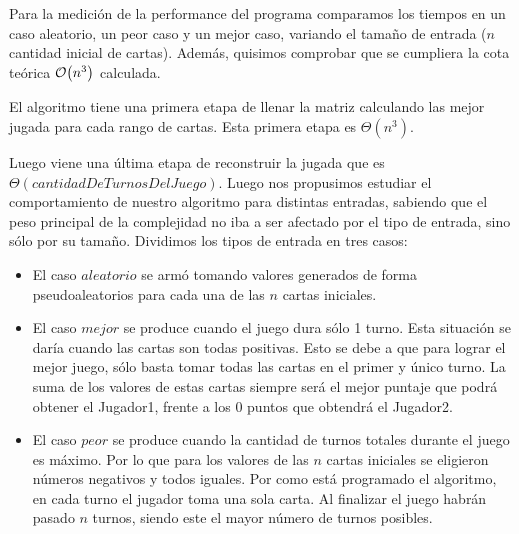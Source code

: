 \documentclass[11pt, a4paper, twoside]{article}
\begin{document}
{}

Para la medición de la performance del programa comparamos los tiempos en un caso aleatorio, un peor caso y 
un mejor caso, variando el tamaño de entrada ($n$ cantidad inicial de cartas). Además, quisimos comprobar que se 
cumpliera la cota teórica $\mathop{}\mathopen{}\mathcal{O}\mathopen{}\left(n^3\right)$ calculada. 

El algoritmo tiene una primera etapa de llenar la matriz calculando las mejor jugada para cada rango de cartas. Esta primera etapa es $\Theta(n^3)$.

Luego viene una última etapa de reconstruir la jugada que es $\Theta(cantidadDeTurnosDelJuego)$. Luego nos propusimos estudiar el comportamiento de nuestro algoritmo para distintas entradas, sabiendo que el peso principal de la complejidad no iba a ser afectado por el tipo de entrada, sino sólo por su tamaño. Dividimos los tipos de entrada en tres casos: 

\begin{itemize}
\item El caso $aleatorio$ se armó tomando valores generados de forma pseudoaleatorios para cada una de las $n$ cartas iniciales. 
\item El caso $mejor$ se produce cuando el juego dura sólo 1 turno. Esta situación se daría cuando las cartas son 
todas positivas. Esto se debe a que para lograr el mejor juego, sólo basta tomar todas las cartas en el primer y 
único turno. La suma de los valores de estas cartas siempre será el mejor puntaje que podrá obtener 
el Jugador1, frente a los 0 puntos que obtendrá el Jugador2. 
\item El caso $peor$ se produce cuando la cantidad de turnos totales durante el juego es máximo. 
Por lo que para los valores de las $n$ cartas iniciales se eligieron números negativos y todos iguales. 
Por como está programado el algoritmo, en cada turno el jugador toma una sola carta. Al finalizar el juego habrán pasado $n$ turnos, 
siendo este el mayor número de turnos posibles.
\end{itemize}
\end{document}
